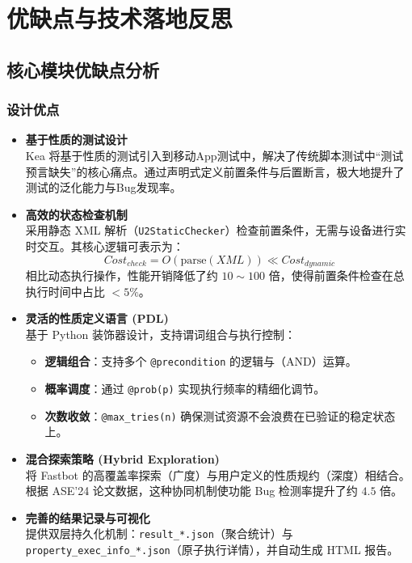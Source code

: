 \documentclass[a4paper, zihao=-4]{ctexart}
\begin{document}
\section{优缺点与技术落地反思}

\subsection{核心模块优缺点分析}

\subsubsection{设计优点}

\begin{itemize}
    \item \textbf{基于性质的测试设计} \\
    Kea 将基于性质的测试引入到移动App测试中，解决了传统脚本测试中“测试预言缺失”的核心痛点。通过声明式定义前置条件与后置断言，极大地提升了测试的泛化能力与Bug发现率。

    \item \textbf{高效的状态检查机制} \\
    采用静态 XML 解析（\texttt{U2StaticChecker}）检查前置条件，无需与设备进行实时交互。其核心逻辑可表示为：
    \begin{equation}
        Cost_{check} = O(\text{parse}(XML)) \ll Cost_{dynamic}
    \end{equation}
    相比动态执行操作，性能开销降低了约 $10 \sim 100$ 倍，使得前置条件检查在总执行时间中占比 $<5\% $。

    \item \textbf{灵活的性质定义语言 (PDL)} \\
    基于 Python 装饰器设计，支持谓词组合与执行控制：
    \begin{itemize}
        \item \textbf{逻辑组合}：支持多个 \texttt{@precondition} 的逻辑与（AND）运算。
        \item \textbf{概率调度}：通过 \texttt{@prob(p)} 实现执行频率的精细化调节。
        \item \textbf{次数收敛}：\texttt{@max\_tries(n)} 确保测试资源不会浪费在已验证的稳定状态上。
    \end{itemize}

    \item \textbf{混合探索策略 (Hybrid Exploration)} \\
    将 Fastbot 的高覆盖率探索（广度）与用户定义的性质规约（深度）相结合。根据 ASE'24 论文数据，这种协同机制使功能 Bug 检测率提升了约 $4.5$ 倍。

    \item \textbf{完善的结果记录与可视化} \\
    提供双层持久化机制：\texttt{result\_*.json}（聚合统计）与 \texttt{property\_exec\_info\_*.json}（原子执行详情），并自动生成 HTML 报告。
\end{itemize}
\end{document}
